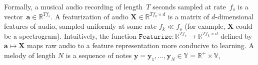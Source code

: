 Formally, a musical audio recording of length~$T$ seconds sampled at rate~$f_s$ is a vector~${\bm{a} \in \mathbb{R}^{Tf_s}}$. 
A featurization of audio ${\bm{X} \in \mathbb{R}^{Tf_k \times d}}$ is a matrix of $d$-dimensional features of audio, sampled uniformly at some rate ${f_k \ll f_s}$ (for example, $\bm{X}$ could be a spectrogram).
Intuitively, the function ${\texttt{Featurize} : \mathbb{R}^{Tf_s} \to \mathbb{R}^{Tf_k \times d}}$ defined by ${\bm{a} \mapsto \bm{X}}$ maps 
raw audio 
to a feature representation more conducive to learning. 
A melody of length $N$ is a sequence of notes 
$\bm{y} = \bm{y}_1,\dots,\bm{y}_N \in \mathbb{Y} = \mathbb{R}^+ \times \mathbb{V}$,  
